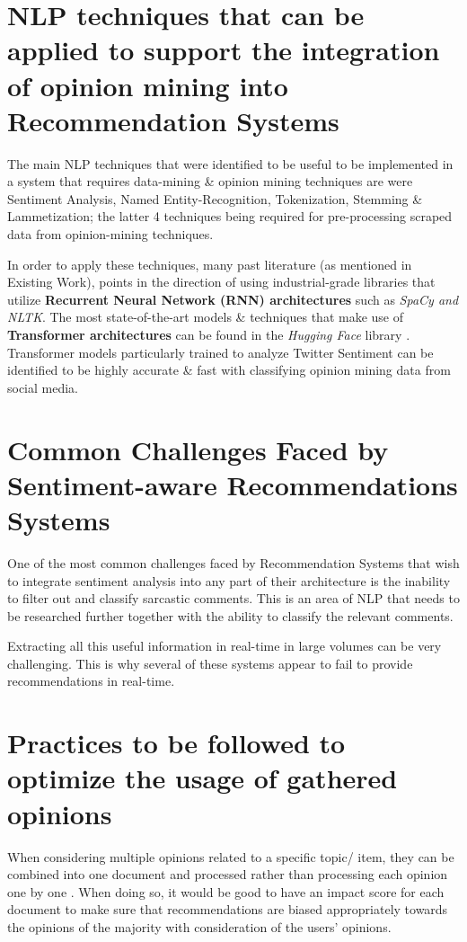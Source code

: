 \documentclass[manuscript,screen,review]{acmart}
\begin{document}
\section{NLP techniques that can be applied to support the integration of opinion mining into Recommendation Systems}

The main NLP techniques that were identified to be useful to be implemented in a system that requires data-mining \& opinion mining techniques are were Sentiment Analysis, Named Entity-Recognition, Tokenization, Stemming \& Lammetization; the latter 4 techniques being required for pre-processing scraped data from opinion-mining techniques.

In order to apply these techniques, many past literature (as mentioned in Existing Work), points in the direction of using industrial-grade libraries that utilize \textbf{Recurrent Neural Network (RNN) architectures} such as \textit{SpaCy and NLTK}. The most state-of-the-art models \& techniques that make use of \textbf{Transformer architectures} can be found in the \textit{Hugging Face} library \cite{wolf_transformers_2020}. Transformer models particularly trained to analyze Twitter Sentiment can be identified to be highly accurate \& fast with classifying opinion mining data from social media.

\section{Common Challenges Faced by Sentiment-aware Recommendations Systems}
One of the most common challenges faced by Recommendation Systems that wish to integrate sentiment analysis into any part of their architecture is the inability to filter out and classify sarcastic comments. This is an area of NLP that needs to be researched further together with the ability to classify the relevant comments.

Extracting all this useful information in real-time in large volumes can be very challenging. This is why several of these systems appear to fail to provide recommendations in real-time.

\section{Practices to be followed to optimize the usage of gathered opinions}
When considering multiple opinions related to a specific topic/ item, they can be combined into one document and processed rather than processing each opinion one by one \cite{nah_opinion_2018}. When doing so, it would be good to have an impact score for each document to make sure that recommendations are biased appropriately towards the opinions of the majority with consideration of the users' opinions.
\end{document}
